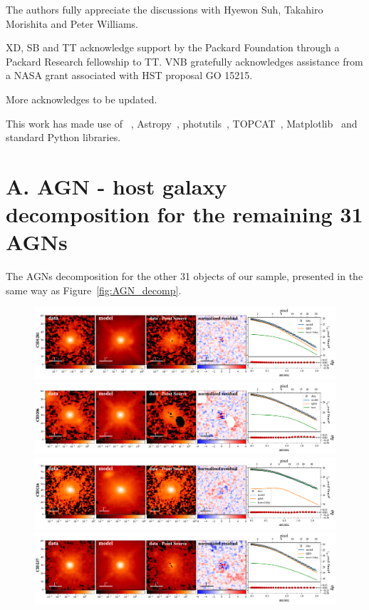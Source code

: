 \documentclass[apj]{emulateapj}
\begin{document}
The authors fully appreciate the discussions with Hyewon Suh, Takahiro Morishita and Peter Williams.

XD, SB and TT acknowledge support by the Packard Foundation through a Packard Research fellowship to TT. VNB gratefully acknowledges assistance from a NASA grant associated with HST proposal GO 15215.

{\color{red} More acknowledges to be updated.}

This work has made use of \lenstronomy~\citep{lenstronomy}, {\sc Astropy}~\citep{Astropy}, {\sc photutils}~\citep{photutils}, {\sc TOPCAT}~\citep{TOPCAT}, {\sc Matplotlib}~\citep{Matplotlib} %
and standard Python libraries.




\newpage

\appendix

\section{A. AGN - host galaxy decomposition for the remaining 31 AGNs}\label{sec:restsample}
The AGNs decomposition for the other 31 objects of our sample, presented in the same way as Figure~\ref{fig:AGN_decomp}.

\begin{figure}[ht]
\centering
{
\includegraphics[height=0.25\textwidth]{fig/best_fit_CID1281_SB_profile.pdf}
\includegraphics[height=0.25\textwidth]{fig/best_fit_CID206_SB_profile.pdf}
\includegraphics[height=0.25\textwidth]{fig/best_fit_CID216_SB_profile.pdf}
\includegraphics[height=0.25\textwidth]{fig/best_fit_CID237_SB_profile.pdf}
}
\end{figure} 
\end{document}
